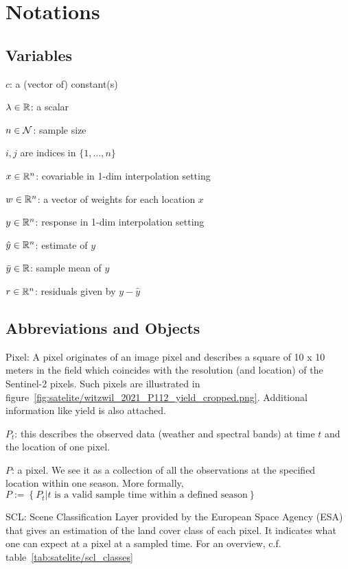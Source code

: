 \chapter*{Notations}
\label{c:Notation}

\section*{Variables}
$c$: a (vector of) constant(s)

$\lambda \in \mathbb{R}$: a scalar

$n\in \operatorname{\mathcal{N}}$: sample size

$i,j$ are indices in $\{1,\dots,n\}$

$x\in \mathbb{R}^n$: covariable in 1-dim interpolation setting

$w \in \mathbb{R}^n$: a vector of weights for each location $x$

$y\in \mathbb{R}^n$: response in 1-dim interpolation setting

$\hat y\in \mathbb{R}^n$: estimate of $y$

$\bar y\in \mathbb{R}$: sample mean of $y$

$r \in \mathbb{R}^n$: residuals given by $y - \hat y$


\section*{Abbreviations and Objects}

Pixel: A pixel originates of an image pixel and describes a square of 10 x 10 meters in the field which coincides with the resolution (and location) of the Sentinel-2 pixels. Such pixels are illustrated in figure~\ref{fig:satelite/witzwil_2021_P112_yield_cropped.png}. Additional information like yield is also attached.

$P_t$: this describes the observed data (weather and spectral bands) at time $t$ and the location of one pixel. 

$P$: a pixel. We see it as a collection of all the observations at the specified location within one season. More formally, $P := \left\{P_t | t\text{ is a valid sample time within a defined season}\right\}$

SCL: Scene Classification Layer provided by the European Space Agency (ESA) that gives an estimation of the land cover class of each pixel. It indicates what one can expect at a pixel at a sampled time. For an overview, c.f. table~\ref{tab:satelite/scl_classes}

